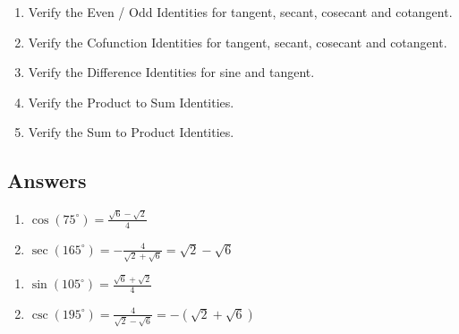 \documentclass{ximera}
\begin{document}
\begin{enumerate}

\setcounter{enumi}{\value{HW}}

\item Verify the Even / Odd Identities for tangent, secant, cosecant and cotangent.

\item Verify the Cofunction Identities for tangent, secant, cosecant and cotangent.

\item Verify the Difference Identities for sine and tangent.

\item Verify the Product to Sum Identities.

\item Verify the Sum to Product Identities.

\end{enumerate}

\pagebreak

\subsection{Answers}

\begin{multicols}{2}

\begin{enumerate}

\addtocounter{enumi}{6}

\item  $\cos(75^{\circ}) = \frac{\sqrt{6} - \sqrt{2}}{4} $
\item  $\sec(165^{\circ}) = -\frac{4}{\sqrt{2}+\sqrt{6}} = \sqrt{2} - \sqrt{6}$

\setcounter{HW}{\value{enumi}}

\end{enumerate}

\end{multicols}

\begin{multicols}{2}

\begin{enumerate}

\setcounter{enumi}{\value{HW}}

\item  $\sin(105^{\circ}) = \frac{\sqrt{6}+\sqrt{2}}{4}$
\item  $\csc(195^{\circ}) = \frac{4}{\sqrt{2}-\sqrt{6}} = -(\sqrt{2}+\sqrt{6})$

\setcounter{HW}{\value{enumi}}

\end{enumerate}

\end{multicols}
\end{document}
